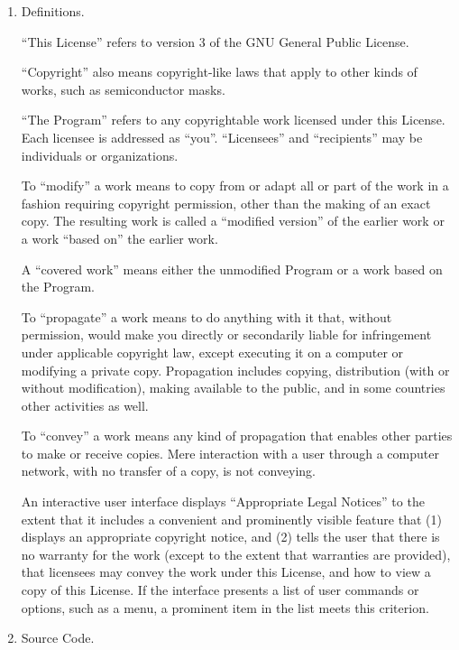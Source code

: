 \documentclass{article}
\begin{document}
\begin{enumerate}[\hspace{-18pt}1.]


\item Definitions.

``This License'' refers to version 3 of the GNU General Public License.

``Copyright'' also means copyright-like laws that apply to other kinds of works, such as semiconductor masks.

``The Program'' refers to any copyrightable work licensed under this License.  Each licensee is addressed as ``you''.  ``Licensees'' and ``recipients'' may be individuals or organizations.

To ``modify'' a work means to copy from or adapt all or part of the work in a fashion requiring copyright permission, other than the making of an exact copy.  The resulting work is called a ``modified version'' of the earlier work or a work ``based on'' the earlier work.

A ``covered work'' means either the unmodified Program or a work based on the Program.

To ``propagate'' a work means to do anything with it that, without permission, would make you directly or secondarily liable for infringement under applicable copyright law, except executing it on a computer or modifying a private copy.  Propagation includes copying, distribution (with or without modification), making available to the public, and in some countries other activities as well.

To ``convey'' a work means any kind of propagation that enables other parties to make or receive copies.  Mere interaction with a user through a computer network, with no transfer of a copy, is not conveying.

An interactive user interface displays ``Appropriate Legal Notices'' to the extent that it includes a convenient and prominently visible feature that (1) displays an appropriate copyright notice, and (2) tells the user that there is no warranty for the work (except to the extent that warranties are provided), that licensees may convey the work under this License, and how to view a copy of this License.  If the interface presents a list of user commands or options, such as a menu, a prominent item in the list meets this criterion.

\item Source Code.


\end{enumerate}
\end{document}
